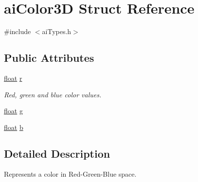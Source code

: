 \hypertarget{structai_color3_d}{\section{ai\-Color3\-D Struct Reference}
\label{structai_color3_d}
}


{\ttfamily \#include $<$ai\-Types.\-h$>$}

\subsection*{Public Attributes}
\begin{DoxyCompactItemize}
\item 
\hyperlink{fmod_8h_aeb841aa4b4b5f444b5d739d865b420af}{float} \hyperlink{structai_color3_d_a0ff704458aa26c84bbfe93b2dd89c630}{r}
\begin{DoxyCompactList}\small\item\em Red, green and blue color values. \end{DoxyCompactList}\item 
\hyperlink{fmod_8h_aeb841aa4b4b5f444b5d739d865b420af}{float} \hyperlink{structai_color3_d_a40ecdcee92b5373cbaa5e00ebcdb2cfb}{g}
\item 
\hyperlink{fmod_8h_aeb841aa4b4b5f444b5d739d865b420af}{float} \hyperlink{structai_color3_d_a02ddcc7af11f7d4d6ea14f1bfb4ef6c7}{b}
\end{DoxyCompactItemize}


\subsection{Detailed Description}
Represents a color in Red-\/\-Green-\/\-Blue space. 

